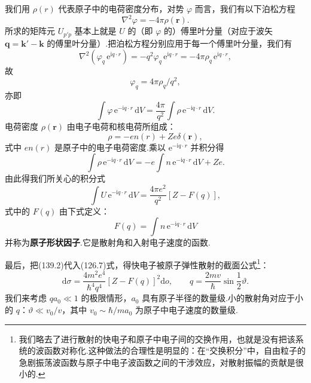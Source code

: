 我们用 $\rho(r)$ 代表原子中的电荷密度分布，对势 $\varphi$ 而言，我们有以下泊松方程
\begin{equation*}
  \nabla^2\varphi=-4\pi\rho(\boldsymbol{r}).
\end{equation*}
所求的矩阵元 $U_{p'p}$ 基本上就是 $U$ 的（即 $\varphi$ 的）傅里叶分量（对应于波矢
$\boldsymbol{q}=\boldsymbol{k}'-\boldsymbol{k}$ 的傅里叶分量）.把泊松方程分别应用于每一个傅里叶分量，我们有
\begin{equation*}
  \nabla^2\left(\varphi_q\,\mathrm{e}^{\mathrm{i}q\cdot r}\right)
  =-q^2\varphi_q\,\mathrm{e}^{\mathrm{i}q\cdot r}
  =-4\pi\rho_q\,\mathrm{e}^{\mathrm{i}q\cdot r},
\end{equation*}
故
\begin{equation*}
  \varphi_q=4\pi\rho_q/q^2,
\end{equation*}
亦即
\begin{equation}
  \int\varphi\,\mathrm{e}^{-\mathrm{i}q\cdot r}\,\mathrm{d}V
  =\frac{4\pi}{q^2}\int\rho\,\mathrm{e}^{-\mathrm{i}q\cdot r}\,\mathrm{d}V.
\end{equation}
电荷密度 $\rho(\boldsymbol{r})$ 由电子电荷和核电荷所组成：
\begin{equation*}
  \rho=-en(r)+Ze\delta(\boldsymbol{r}),
\end{equation*}
式中 $en(r)$ 是原子中的电子电荷密度.乘以 $\mathrm{e}^{-\mathrm{i}q\cdot r}$ 并积分得
\begin{equation*}
  \int\rho\,\mathrm{e}^{-\mathrm{i}q\cdot r}\,\mathrm{d}V
  =-e\int n\,\mathrm{e}^{-\mathrm{i}q\cdot r}\,\mathrm{d}V+Ze.
\end{equation*}
由此得我们所关心的积分式
\begin{equation}
  \int U\,\mathrm{e}^{-\mathrm{i}q\cdot r}\,\mathrm{d}V
  =\frac{4\pi e^2}{q^2}\left[Z-F(q)\right],
\end{equation}
式中的 $F(q)$ 由下式定义：
\begin{equation}
  F(q)=\int n\,\mathrm{e}^{-\mathrm{i}q\cdot r}\,\mathrm{d}V
\end{equation}
并称为\textbf{原子形状因子}.它是散射角和入射电子速度的函数.

最后，把(139.2)代入(126.7)式，得快电子被原子弹性散射的截面公式\footnote{我们略去了进行散射的快电子和原子中电子间的交换作用，也就是没有把该系统的波函数对称化.这种做法的合理性是明显的：在“交换积分”中，自由粒子的急剧振荡波函数与原子中电子波函数之间的干涉效应，对散射振幅的贡献是很小的.}：
\begin{equation}
  \mathrm{d}\sigma=\frac{4m^2e^4}{\hbar^4q^4}
  \left[Z-F(q)\right]^2\mathrm{d}o,
  \qquad
  q=\frac{2mv}{\hbar}\sin\frac{1}{2}\vartheta.
\end{equation}
我们来考虑 $qa_0\ll1$ 的极限情形，$a_0$ 具有原子半径的数量级.小的散射角对应于小的 $q$：$\vartheta\ll v_0/v$，其中 $v_0\sim\hbar/ma_0$ 为原子中电子速度的数量级.

